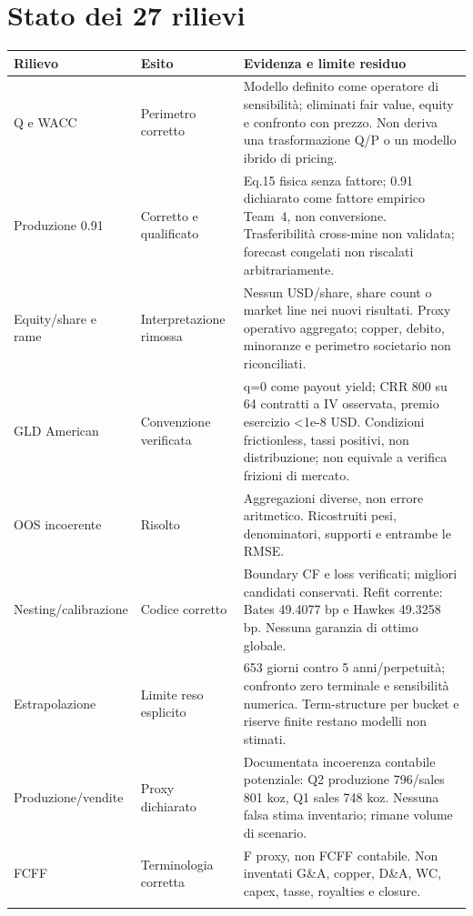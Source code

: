 \documentclass[10pt,a4paper]{article}
\begin{document}
\section{Stato dei 27 rilievi}
\begin{longtable}{p{}p{}p{}}\toprule
Rilievo & Esito & Evidenza e limite residuo\\\midrule\endhead
Q e WACC & Perimetro corretto & Modello definito come operatore di sensibilità; eliminati fair value, equity e confronto con prezzo. Non deriva una trasformazione Q/P o un modello ibrido di pricing. \\ \addlinespace
Produzione 0.91 & Corretto e qualificato & Eq.15 fisica senza fattore; 0.91 dichiarato come fattore empirico Team~4, non conversione. Trasferibilità cross-mine non validata; forecast congelati non riscalati arbitrariamente. \\ \addlinespace
Equity/share e rame & Interpretazione rimossa & Nessun USD/share, share count o market line nei nuovi risultati. Proxy operativo aggregato; copper, debito, minoranze e perimetro societario non riconciliati. \\ \addlinespace
GLD American & Convenzione verificata & q=0 come payout yield; CRR 800 su 64 contratti a IV osservata, premio esercizio <1e-8 USD. Condizioni frictionless, tassi positivi, non distribuzione; non equivale a verifica frizioni di mercato. \\ \addlinespace
OOS incoerente & Risolto & Aggregazioni diverse, non errore aritmetico. Ricostruiti pesi, denominatori, supporti e entrambe le RMSE. \\ \addlinespace
Nesting/calibrazione & Codice corretto & Boundary CF e loss verificati; migliori candidati conservati. Refit corrente: Bates 49.4077 bp e Hawkes 49.3258 bp. Nessuna garanzia di ottimo globale. \\ \addlinespace
Estrapolazione & Limite reso esplicito & 653 giorni contro 5 anni/perpetuità; confronto zero terminale e sensibilità numerica. Term-structure per bucket e riserve finite restano modelli non stimati. \\ \addlinespace
Produzione/vendite & Proxy dichiarato & Documentata incoerenza contabile potenziale: Q2 produzione 796/sales 801 koz, Q1 sales 748 koz. Nessuna falsa stima inventario; rimane volume di scenario. \\ \addlinespace
FCFF & Terminologia corretta & F proxy, non FCFF contabile. Non inventati G\&A, copper, D\&A, WC, capex, tasse, royalties e closure. \\ \addlinespace

\end{longtable}
\end{document}
